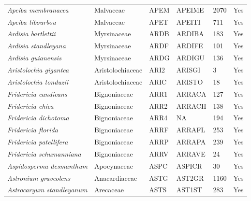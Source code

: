 \documentclass[11pt]{article}
\begin{document}
\begin{longtable}{@{}llllll@{}}
\textit{Apeiba membranacea}                           & Malvaceae        & APEM   & APEIME & 2070            & Yes       \\
\textit{Apeiba tibourbou}                             & Malvaceae        & APET   & APEITI & 711             & Yes       \\
\textit{Ardisia bartlettii}                           & Myrsinaceae      & ARDB   & ARDIBA & 183             & Yes       \\
\textit{Ardisia standleyana}                          & Myrsinaceae      & ARDF   & ARDIFE & 101             & Yes       \\
\textit{Ardisia guianensis}                           & Myrsinaceae      & ARDG   & ARDIGU & 136             & Yes       \\
\textit{Aristolochia gigantea}                        & Aristolochiaceae & ARI2   & ARISGI & 3               & Yes       \\
\textit{Aristolochia tonduzii}                        & Aristolochiaceae & ARIC   & ARISTO & 18              & Yes       \\
\textit{Fridericia candicans}                         & Bignoniaceae     & ARR1   & ARRACA & 127             & Yes       \\
\textit{Fridericia chica}                             & Bignoniaceae     & ARR2   & ARRACH & 138             & Yes       \\
\textit{Fridericia dichotoma}                         & Bignoniaceae     & ARR4   & NA     & 194             & Yes       \\
\textit{Fridericia florida}                           & Bignoniaceae     & ARRF   & ARRAFL & 253             & Yes       \\
\textit{Fridericia patellifera}                       & Bignoniaceae     & ARRP   & ARRAPA & 239             & Yes       \\
\textit{Fridericia schumanniana}                      & Bignoniaceae     & ARRV   & ARRAVE & 24              & Yes       \\
\textit{Aspidosperma desmanthum}                      & Apocynaceae      & ASPC   & ASPICR & 30              & Yes       \\
\textit{Astronium graveolens}                         & Anacardiaceae    & ASTG   & AST2GR & 1160            & Yes       \\
\textit{Astrocaryum standleyanum}                     & Arecaceae        & ASTS   & AST1ST & 283             & Yes       \\

\end{longtable}
\end{document}
